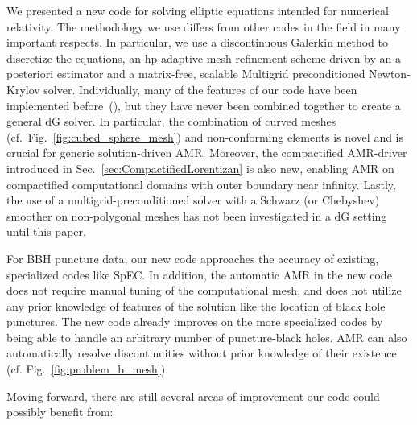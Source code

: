 We presented a new code for solving
elliptic equations intended for numerical
relativity. The methodology we use differs from other codes in the
field in many important respects. In particular, we use a
discontinuous Galerkin method to discretize the equations, an
hp-adaptive mesh refinement scheme driven by an a posteriori estimator
and a matrix-free, scalable Multigrid preconditioned Newton-Krylov
solver.
Individually, many of the features of our
  code have been implemented before~(\citet*{kozdon2018energy,kozdon2019robust,stiller2017robust,sundar2012parallel,hesthaven2008nodal}), but they have never been combined together to create a general dG solver.  In particular, the combination of curved meshes (cf.\ Fig.~\ref{fig:cubed_sphere_mesh}) and non-conforming elements
  is novel and is crucial for generic solution-driven AMR.  Moreover,
  the compactified AMR-driver introduced in
  Sec.~\ref{sec:CompactifiedLorentizan} is also new, enabling AMR on compactified computational domains with outer boundary near infinity. Lastly, the use of a multigrid-preconditioned solver with a Schwarz (or Chebyshev) smoother on non-polygonal meshes has not been investigated in a dG setting until this paper.


For BBH puncture data, our new code approaches the accuracy of
  existing, specialized codes like SpEC.  In addition, the automatic
  AMR in the new code does not require manual tuning of the
  computational mesh, and does not utilize any prior knowledge of
  features of the solution like the location of black hole punctures.
  The new code already improves on the more specialized codes by being
  able to handle an arbitrary number of puncture-black holes.  AMR can
  also automatically resolve discontinuities without prior knowledge
  of their existence (cf. Fig.~\ref{fig:problem_b_mesh}).

  Moving forward, there are
still several areas of improvement our code could possibly benefit
from:

